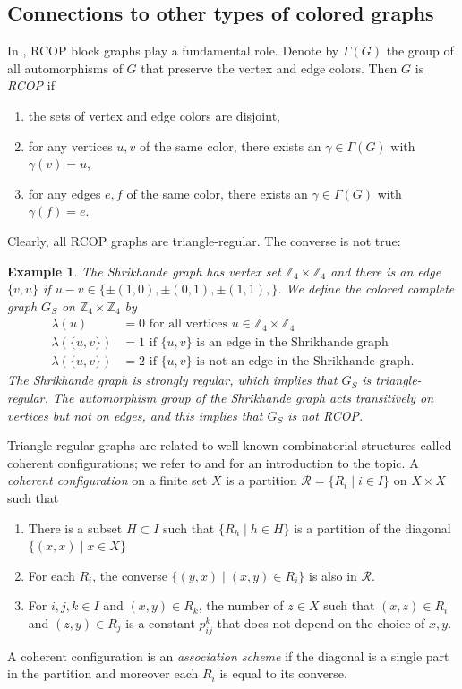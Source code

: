 \documentclass[a4paper, 11pt]{amsart}
\numberwithin{theorem}{section}
\newtheorem{example}[theorem]{Example}
\def\Z{{\mathbb Z}}
\begin{document}
\subsection{Connections to other types of colored graphs}
In \cite{CMMPS23}, RCOP block graphs play a fundamental role. Denote
by $\Gamma (G)$ the group of all automorphisms of $G$ that preserve
the vertex and edge colors. Then $G$ is \emph{RCOP} if 
\begin{enumerate}
    \item the sets of vertex and edge colors are disjoint,
    \item for any vertices $u,v$ of the same color, there exists an
    $\gamma  \in \Gamma (G)$ with $\gamma (v) = u$,
    \item for any edges $e,f$ of the same color, there exists an
    $\gamma \in \Gamma (G)$ with $\gamma (f) = e$.
\end{enumerate}
Clearly, all RCOP graphs are triangle-regular. The converse is not true:
\begin{example} \label{ex:Shrikhande}
    The {\em Shrikhande graph} has vertex set $\Z _4 \times \Z _4$ and
    there is an edge $\{v,u\}$ if $u-v \in \{\pm (1,0), \pm (0,1), \pm
    (1,1),\}$. We define the colored complete graph $G_S$ on $\Z_4
    \times \Z_4$ by 
    \begin{align*}
        \lambda (u ) &= 0 \text{ for all vertices }u \in \Z_4 \times
	\Z_4 \\
        \lambda (\{u,v\}) &=1 \text{ if $\{u,v\}$ is an edge in the Shrikhande graph} \\
        \lambda (\{u,v\}) &=2 \text{ if $\{u,v\}$ is not an edge in the Shrikhande graph}.
    \end{align*}
    The Shrikhande graph is strongly regular, which implies that $G_S$
    is triangle-regular. The automorphism group of the Shrikhande graph
    acts transitively on vertices but not on edges, and this implies
    that $G_S$ is not RCOP.
\end{example}


Triangle-regular graphs are related to well-known combinatorial
structures called coherent configurations; we refer to \cite{Brouwer_coherent} and \cite{Cameron03_coherent_conf} for an introduction to the topic. A \emph{coherent configuration} on a finite set $X$ is a partition $\mathcal{R} = \{R_i \mid i \in I\}$ on $X \times X$ such that 
\begin{enumerate}
    \item There is a subset $H \subset I$ such that $\{R_h \mid h \in H\}$ is a partition of the diagonal $\{(x,x) \mid x \in X\}$
    \item For each $R_i$, the converse $\{(y,x) \mid (x,y) \in R_i\}$ is also in $\mathcal{R}$.
    \item For $i,j,k \in I$ and $(x,y) \in R_k$, the number of $z \in X$ such that $(x,z)\in R_i$ and $(z,y)\in R_j$ is a constant $p_{ij}^k$ that does not depend on the choice of $x,y.$
\end{enumerate}
A coherent configuration is an {\em association scheme} if the diagonal
is a single part in the partition and moreover each $R_i$ is equal to
its converse.
\end{document}
